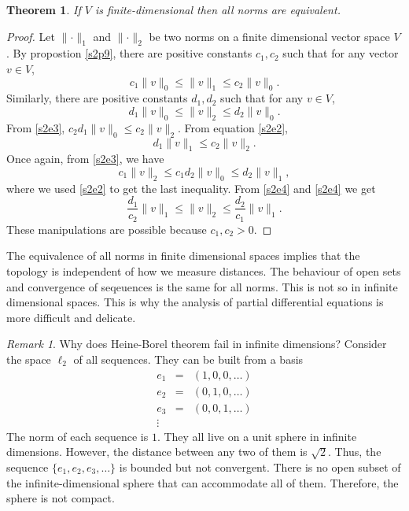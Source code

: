 \documentclass{article}
\theoremstyle{plain}
\newtheorem{thm}{Theorem}
\numberwithin{thm}{section}
\theoremstyle{plain}
\numberwithin{prop}{section}
\theoremstyle{definition}
\numberwithin{defn}{section}
\theoremstyle{remark}
\newtheorem*{rem}{Remark}
\numberwithin{equation}{section}
\begin{document}
\begin{thm}\label{s2t1}
If $V$ is finite-dimensional then all norms are equivalent.
\end{thm}
\begin{proof}
Let $\lVert\cdot\rVert_1$ and $\lVert\cdot\rVert_2$ be two norms on a finite
dimensional vector space $V$. By propostion \ref{s2p9}, there are positive
constants $c_1, c_2$ such that for any vector $v \in V$,
\begin{equation}\label{s2e2}
c_1\lVert v \rVert_0 \le \lVert v \rVert_1 \le c_2 \lVert v \rVert_0.
\end{equation}
Similarly, there are positive constants $d_1, d_2$ such that for any $v \in V$,
\begin{equation}\label{s2e3}
d_1\lVert v \rVert_0 \le \lVert v \rVert_2 \le d_2 \lVert v \rVert_0.
\end{equation}
From \eqref{s2e3}, $c_2d_1\lVert v \rVert_0 \le c_2\lVert v \rVert_2$. From
equation \eqref{s2e2}, 
\begin{equation}\label{s2e4}
d_1\lVert v \rVert_1 \le c_2\lVert v \rVert_2.
\end{equation}
Once again, from \eqref{s2e3}, we have 
\begin{equation}\label{s2e5}
c_1\lVert v \rVert_2 \le c_1d_2\lVert v \rVert_0 \le d_2\lVert v \rVert_1,
\end{equation}
where we used \eqref{s2e2} to get the last
inequality. From \eqref{s2e4} and \eqref{s2e4} we get
\[
\frac{d_1}{c_2}\lVert v \rVert_1 \le \lVert v \rVert_2 \le \frac{d_2}{c_1}
\lVert v \rVert_1.
\]
These manipulations are possible because $c_1, c_2 > 0$.
\end{proof}

The equivalence of all norms in finite dimensional spaces implies that the
topology is independent of how we measure distances. The behaviour of open sets
and convergence of seqeuences is the same for all norms. This is not so in
infinite dimensional spaces. This is why the analysis of partial differential
equations is more difficult and delicate.

\begin{rem}
Why does Heine-Borel theorem fail in infinite dimensions? Consider the space
$\ell_2$ of all sequences. They can be built from a basis 
\begin{eqnarray*}
e_1 &=& (1, 0, 0, \ldots) \\
e_2 &=& (0, 1, 0, \ldots) \\
e_3 &=& (0, 0, 1, \ldots) \\
\vdots
\end{eqnarray*}
The norm of each sequence is $1$. They all live on a unit sphere in infinite 
dimensions. However, the distance between any two of them is $\sqrt{2}$. Thus, 
the sequence $\{e_1, e_2, e_3, \ldots\}$ is bounded but not convergent. There 
is no open subset of the infinite-dimensional sphere that can accommodate all 
of them.  Therefore, the sphere is not compact.
\end{rem}
\end{document}
